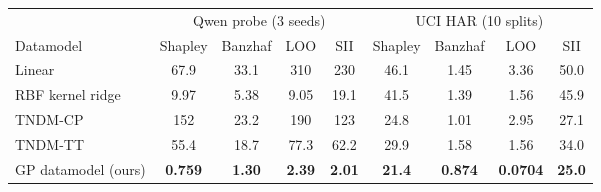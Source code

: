 \begin{tabular}{@{}lcccccccc@{}}
\toprule
& \multicolumn{4}{c}{Qwen probe (3 seeds)} & \multicolumn{4}{c}{UCI HAR (10 splits)} \\
\cmidrule(lr){2-5}\cmidrule(lr){6-9}
Datamodel & Shapley & Banzhaf & LOO & SII & Shapley & Banzhaf & LOO & SII \\
\midrule
Linear & 67.9 & 33.1 & 310 & 230 & 46.1 & 1.45 & 3.36 & 50.0 \\
RBF kernel ridge & 9.97 & 5.38 & 9.05 & 19.1 & 41.5 & 1.39 & 1.56 & 45.9 \\
TNDM-CP & 152 & 23.2 & 190 & 123 & 24.8 & 1.01 & 2.95 & 27.1 \\
TNDM-TT & 55.4 & 18.7 & 77.3 & 62.2 & 29.9 & 1.58 & 1.56 & 34.0 \\
GP datamodel (ours) & \textbf{0.759} & \textbf{1.30} & \textbf{2.39} & \textbf{2.01} & \textbf{21.4} & \textbf{0.874} & \textbf{0.0704} & \textbf{25.0} \\
\bottomrule
\end{tabular}
